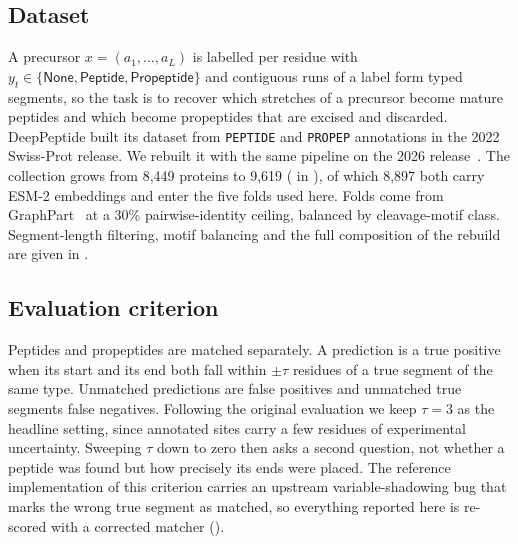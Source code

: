 \documentclass{article}
\begin{document}
\subsection{Dataset}
\label{sec:dataset}
A precursor $x=(a_1,\dots,a_L)$ is labelled per residue with $y_t \in \{\textsf{None},\textsf{Peptide},\textsf{Propeptide}\}$ and contiguous runs of a label form typed segments, so the task is to recover which stretches of a precursor become mature peptides and which become propeptides that are excised and discarded.
DeepPeptide built its dataset from \texttt{PEPTIDE} and \texttt{PROPEP} annotations in the 2022 Swiss-Prot release. We rebuilt it with the same pipeline on the 2026 release~\citep{uniprot2025}. The collection grows from 8{,}449 proteins to 9{,}619 ( in ), of which 8{,}897 both carry ESM-2 embeddings and enter the five folds used here.
Folds come from GraphPart~\citep{graphpart2023} at a 30\% pairwise-identity ceiling, balanced by cleavage-motif class. Segment-length filtering, motif balancing and the full composition of the rebuild are given in .

\subsection{Evaluation criterion}
\label{sec:matching}

Peptides and propeptides are matched separately. A prediction is a true positive when its start and its end both fall within $\pm\tau$ residues of a true segment of the same type. Unmatched predictions are false positives and unmatched true segments false negatives. Following the original evaluation we keep $\tau=3$ as the headline setting, since annotated sites carry a few residues of experimental uncertainty. Sweeping $\tau$ down to zero then asks a second question, not whether a peptide was found but how precisely its ends were placed. The reference implementation of this criterion carries an upstream variable-shadowing bug that marks the wrong true segment as matched, so everything reported here is re-scored with a corrected matcher ().
\end{document}
